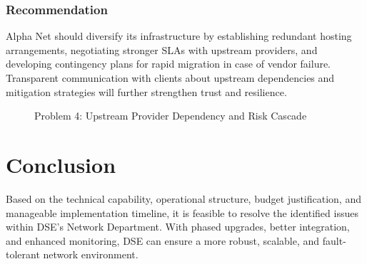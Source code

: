 \subsubsection*{Recommendation}
Alpha Net should diversify its infrastructure by establishing redundant hosting arrangements, negotiating stronger SLAs with upstream providers, and developing contingency plans for rapid migration in case of vendor failure. Transparent communication with clients about upstream dependencies and mitigation strategies will further strengthen trust and resilience.

\begin{figure}[ht]
\centering

\caption{Problem 4: Upstream Provider Dependency and Risk Cascade}
\label{fig:problem4_flowchart}
\end{figure}

\section{Conclusion}
Based on the technical capability, operational structure, budget justification, and manageable implementation timeline, it is feasible to resolve the identified issues within DSE's Network Department. With phased upgrades, better integration, and enhanced monitoring, DSE can ensure a more robust, scalable, and fault-tolerant network environment.
